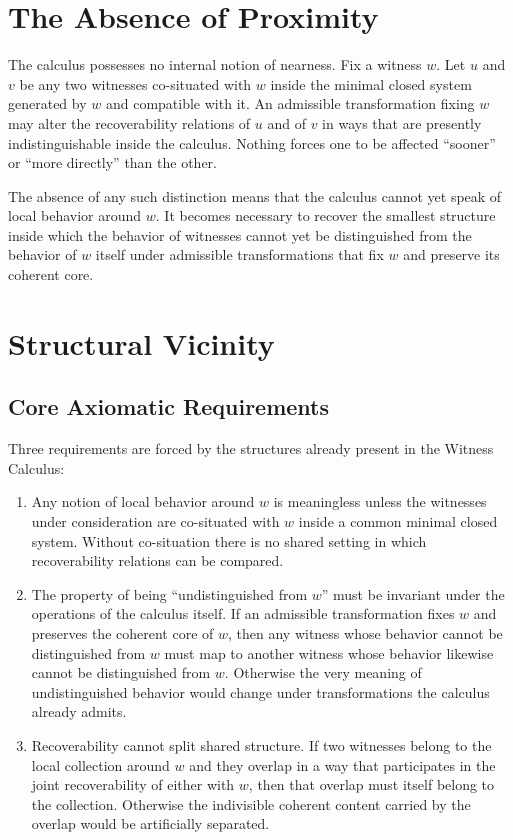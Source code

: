 \documentclass[12pt,anyside]{book}
\begin{document}
\section{The Absence of Proximity}
The calculus possesses no internal notion of nearness. Fix a witness $w$. Let $u$ and $v$ be any two witnesses co-situated with $w$ inside the minimal closed system generated by $w$ and compatible with it. An admissible transformation fixing $w$ may alter the recoverability relations of $u$ and of $v$ in ways that are presently indistinguishable inside the calculus. Nothing forces one to be affected ``sooner'' or ``more directly'' than the other. 

The absence of any such distinction means that the calculus cannot yet speak of local behavior around $w$. It becomes necessary to recover the smallest structure inside which the behavior of witnesses cannot yet be distinguished from the behavior of $w$ itself under admissible transformations that fix $w$ and preserve its coherent core.

\section{Structural Vicinity}
\subsection{Core Axiomatic Requirements}
Three requirements are forced by the structures already present in the Witness Calculus:
\begin{enumerate}[label=\arabic*.]
    \item Any notion of local behavior around $w$ is meaningless unless the witnesses under consideration are co-situated with $w$ inside a common minimal closed system. Without co-situation there is no shared setting in which recoverability relations can be compared.
    \item The property of being ``undistinguished from $w$'' must be invariant under the operations of the calculus itself. If an admissible transformation fixes $w$ and preserves the coherent core of $w$, then any witness whose behavior cannot be distinguished from $w$ must map to another witness whose behavior likewise cannot be distinguished from $w$. Otherwise the very meaning of undistinguished behavior would change under transformations the calculus already admits.
    \item Recoverability cannot split shared structure. If two witnesses belong to the local collection around $w$ and they overlap in a way that participates in the joint recoverability of either with $w$, then that overlap must itself belong to the collection. Otherwise the indivisible coherent content carried by the overlap would be artificially separated.
\end{enumerate}
\end{document}

